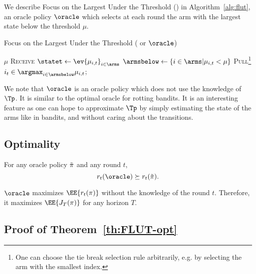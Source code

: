 We describe Focus on the Largest Under the Threshold (\FLUT) in Algorithm~\ref{alg:flut}, an oracle policy $\oracle$ which selects at each round the arm with the largest state below the threshold $\mu$.
\begin{minipage}{\textwidth}
\renewcommand*\footnoterule{}
\begin{savenotes}
\begin{algorithm}[H]
\caption{Focus on the Largest Under the Threshold ({\FLUT} or $\oracle$)}
\label{alg:flut}
\begin{algorithmic}[1]
\Require $\mu$
		\State \textsc{Receive} $\statet \leftarrow \ev{\mu_{i,t}}_{i \in \arms}$
		\State $\armsbelow \leftarrow \left\{i \in \arms | \mu_{i,t} < \mu \right\}$
		\If {$\armsbelow \neq \ev{}$}
		\textsc{Pull}\footnote{One can choose the tie break selection rule arbitrarily, e.g. by selecting the arm with the smallest index.} $i_t \in \argmax_{i \in \armsbelow} \mu_{i,t}$; 
		\EndIf
	\EndFor
\end{algorithmic}
\end{algorithm}
\end{savenotes}
\end{minipage}
\begin{remark}
We note that $\oracle$ is an oracle policy which does not use the knowledge of $\Tp$. It is similar to the optimal oracle for rotting bandits. It is an interesting feature as one can hope to approximate $\Tp$ by simply estimating the state of the arms like in bandits, and without caring about the transitions.
\end{remark}

\subsection{Optimality}
\begin{theorem}
\label{th:FLUT-opt}
For any oracle policy $\Tilde{\pi}$ and any round $t$, 
\[
r_t(\oracle) \succeq r_t(\Tilde{\pi}).
\]
\end{theorem}

\begin{corollary}
$\oracle$ maximizes $\EE{r_t(\pi)}$ without the knowledge of the round $t$. Therefore, it maximizes $\EE{J_T(\pi)}$ for any horizon $T$.
\end{corollary}


\subsection{Proof of Theorem~\ref{th:FLUT-opt}}
